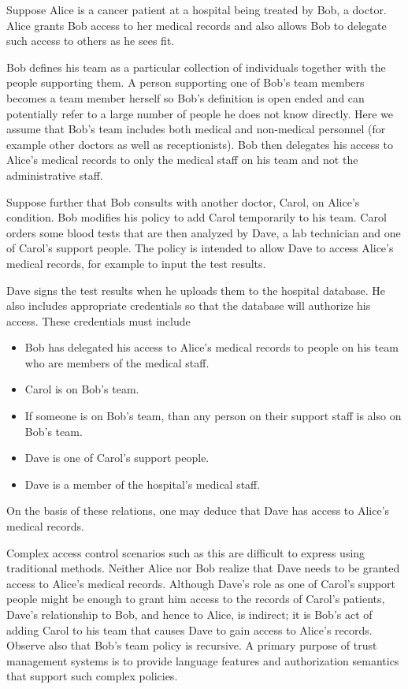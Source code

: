 Suppose Alice is a cancer patient at a hospital being treated by Bob, a doctor. Alice grants Bob
access to her medical records and also allows Bob to delegate such access to others as he sees
fit.

Bob defines his team as a particular collection of individuals together with the people
supporting them. A person supporting one of Bob's team members becomes a team member herself so
Bob's definition is open ended and can potentially refer to a large number of people he does not
know directly. Here we assume that Bob's team includes both medical and non-medical personnel
(for example other doctors as well as receptionists). Bob then delegates his access to Alice's
medical records to only the medical staff on his team and not the administrative staff.

Suppose further that Bob consults with another doctor, Carol, on Alice's condition. Bob modifies
his policy to add Carol temporarily to his team. Carol orders some blood tests that are then
analyzed by Dave, a lab technician and one of Carol's support people. The policy is intended to
allow Dave to access Alice's medical records, for example to input the test results.

Dave signs the test results when he uploads them to the hospital database. He
also includes appropriate credentials so that the database will authorize his
access. These credentials must include
\begin{itemize}

\item Bob has delegated his access to Alice's medical records to people on his team who are
  members of the medical staff.

\item Carol is on Bob's team.

\item If someone is on Bob's team, than any person on their support staff is also on Bob's team.

\item Dave is one of Carol's support people.

\item Dave is a member of the hospital's medical staff.

\end{itemize}
On the basis of these relations, one may deduce that Dave has access to Alice's medical records.

Complex access control scenarios such as this are difficult to express using traditional
methods. Neither Alice nor Bob realize that Dave needs to be granted access to Alice's medical
records. Although Dave's role as one of Carol's support people might be enough to grant him
access to the records of Carol's patients, Dave's relationship to Bob, and hence to Alice, is
indirect; it is Bob's act of adding Carol to his team that causes Dave to gain access to Alice's
records. Observe also that Bob's team policy is recursive. A primary purpose of trust management
systems is to provide language features and authorization semantics that support such complex
policies.

